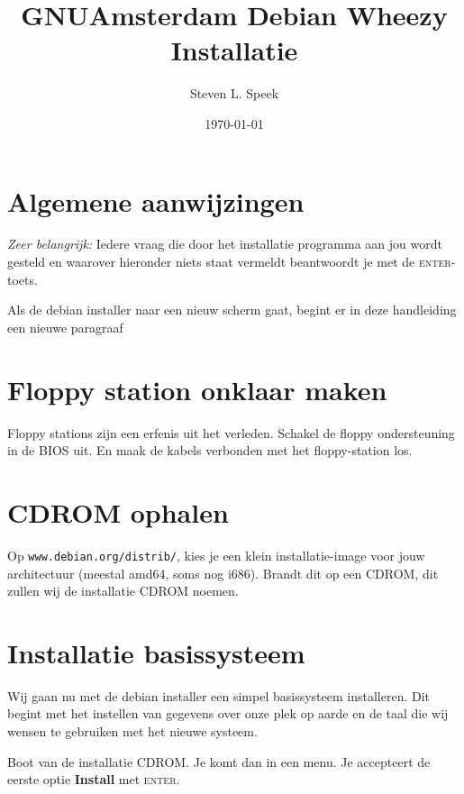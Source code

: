 \documentclass[12pt,a4paper]{article}
\begin{document}
\graphicspath{ {./images/} }
\lstset{language=bash}      
\author{Steven L. Speek}
\title{GNUAmsterdam Debian Wheezy Installatie}
\date{\today}
\maketitle
{}


\section{Algemene aanwijzingen}
\emph{Zeer belangrijk:} Iedere vraag die door het installatie programma aan jou wordt gesteld en waarover hieronder niets staat vermeldt beantwoordt je met de \textsc{enter}-toets.

Als de debian installer naar een nieuw scherm gaat, begint er in deze handleiding een nieuwe paragraaf


\section{Floppy station onklaar maken}
Floppy stations zijn een erfenis uit het verleden. Schakel de floppy ondersteuning in de BIOS uit. En maak de kabels verbonden met het floppy-station los.


\section{CDROM ophalen}
Op \texttt{www.debian.org/distrib/}, kies je een klein installatie-image voor jouw architectuur (meestal amd64, soms nog i686).
Brandt dit op een CDROM, dit zullen wij de installatie CDROM noemen.


\section{Installatie basissysteem}
Wij gaan nu met de debian installer een simpel basissysteem installeren. Dit begint met het instellen van gegevens over onze plek op aarde en de taal die wij wensen te gebruiken met het nieuwe systeem.

Boot van de installatie CDROM. Je komt dan in een menu.
Je accepteert de eerste optie \textbf{Install} met \textsc{enter}.
\end{document}
